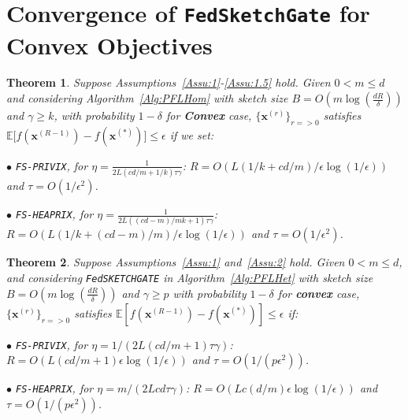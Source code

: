 \documentclass[sigconf, anonymous, review]{acmart}
\newcommand{\todo}[1]{\textcolor{red}{ToDo:~#1}}
\newtheorem{theorem}{Theorem}
\begin{document}
\section{Convergence of \texttt{FedSketchGate} for Convex Objectives}\label{sec:cvx_cvrg_app}
\begin{theorem}\label{thm:homog_case_append}
Suppose Assumptions~\ref{Assu:1}-\ref{Assu:1.5} hold. 
Given $0<m\leq d$ and considering Algorithm~\ref{Alg:PFLHom} with sketch size $B=O\left(m\log\left(\frac{d R}{\delta}\right)\right)$ and $\gamma\geq k$, with probability $1-\delta$ for \textbf{Convex} case, $\{ {\boldsymbol{x}}^{(r)}\}_{r=>0}$ satisfies $ \mathbb{E}\Big[f({\boldsymbol{x}}^{(R-1)})-f({\boldsymbol{x}}^{(*)})\Big]\leq \epsilon$ if we set:  

\noindent $\bullet$ \texttt{FS-PRIVIX}, for $\eta=\frac{1}{2L(cd/m+1/k)\tau\gamma}$: $R =O\left(L\left(1/k+cd/m\right)/\epsilon\log\left(1/\epsilon \right)\right)$ and
$\tau=O\left(1/\epsilon^2\right)$.

\noindent $\bullet$ \texttt{FS-HEAPRIX}, for $\eta=\frac{1}{2L\left((cd-m)/mk+1\right)\tau\gamma}$:   $R =O\left(L\left(1/k+(cd-m)/m\right)/\epsilon\log\left(1/\epsilon \right)\right)$ and $\tau=O\left(1/\epsilon^2\right)$.


\end{theorem}

\begin{theorem}\label{thm:hetreg_case_appendix_cvx}
Suppose Assumptions~\ref{Assu:1} and~\ref{Assu:2} hold. Given $0<m\leq d$, and considering \texttt{FedSKETCHGATE} in Algorithm~\ref{Alg:PFLHet} with sketch size $B=O\left(m\log\left(\frac{d R}{\delta}\right)\right)$ and $\gamma\geq p$ with probability $1-\delta$ for \textbf{convex} case, $\{ {\boldsymbol{x}}^{(r)}\}_{r=>0}$ satisfies $ \mathbb{E}[f({\boldsymbol{x}}^{(R-1)})-f({\boldsymbol{x}}^{(*)})]\leq \epsilon$ if: 
 
\noindent $\bullet$ \texttt{FS-PRIVIX}, for $\eta=1/(2L(c d/m+1)\tau\gamma)$:  $R=O\left(L(cd/m+1)\epsilon \log(1/\epsilon)\right)$ and $\tau=O\left(1/(p\epsilon^2)\right)$.

\noindent $\bullet$ \texttt{FS-HEAPRIX}, for $\eta=m/(2L c d\tau\gamma)$: $R=O\left(Lc(d/m)\epsilon \log(1/\epsilon)\right)$ and $\tau=O\left(1/(p\epsilon^2)\right)$.
 \end{theorem}
\end{document}
